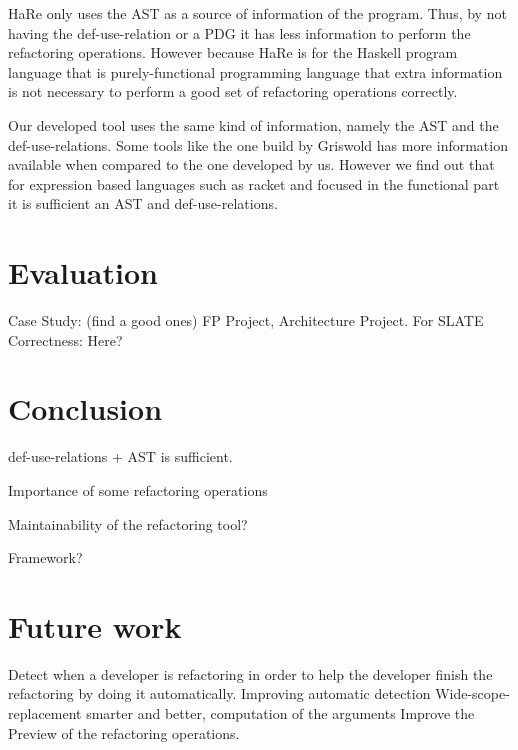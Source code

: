 HaRe only uses the AST as a source of information of the program. Thus, by not having
the def-use-relation or a PDG it has less information to perform the refactoring operations.
However because HaRe is for the Haskell program language that is purely-functional
programming language that extra information is not necessary to perform a good set of
refactoring operations correctly.

Our developed tool uses the same kind of information, namely the AST and the def-use-relations.
Some tools like the one build by Griswold has more information available when compared
to the one developed by us. However we find out that for expression based languages
such as racket and focused in the functional part it is sufficient an AST and
def-use-relations.






\section{Evaluation}
Case Study: (find a good ones) FP Project, Architecture Project. For SLATE
Correctness: Here?
\section{Conclusion}
def-use-relations + AST is sufficient.

Importance of some refactoring operations

Maintainability of the refactoring tool?

Framework?
\section{Future work}
Detect when a developer is refactoring in order to help the developer finish the
refactoring by doing it automatically.
Improving automatic detection
Wide-scope-replacement smarter and better, computation of the arguments
Improve the Preview of the refactoring operations.
